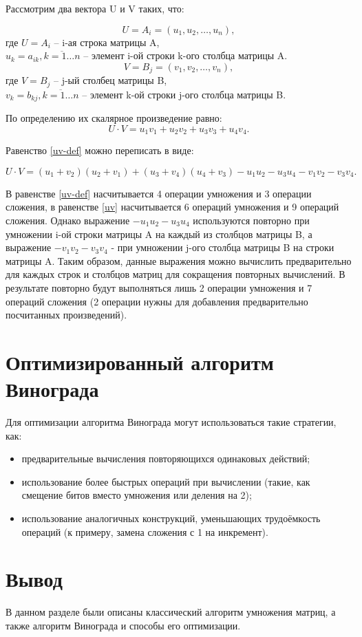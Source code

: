 Рассмотрим два вектора U и V таких, что:

\begin{equation}
	\label{u-def}
	U = A_{i} = (u_{1}, u_{2}, \ldots, u_{n}),
\end{equation}
где $U = A_{i}$ -- i-ая строка матрицы A,\\
$u_{k} = a_{ik}, \overline{k = 1 \ldots n}$ -- элемент i-ой строки k-ого столбца матрицы A.\\

\begin{equation}
	\label{v-def}
	V = B_{j} = (v_{1}, v_{2}, \ldots, v_{n}),
\end{equation}
где $V = B_{j}$ -- j-ый столбец матрицы B,\\
$v_{k} = b_{kj}, \overline{k = 1 \ldots n}$ -- элемент k-ой строки j-ого столбца матрицы B.

По определению их скалярное произведение равно:
\begin{equation}
	\label{uv-def}
	U \cdot V = u_{1}v_{1} + u_{2}v_{2} + u_{3}v_{3} + u_{4}v_{4}.
\end{equation}

Равенство \ref{uv-def} можно переписать в виде:

\begin{equation}
	\label{uv}
	U \cdot V = (u_{1} + v_{2})(u_{2} + v_{1}) + (u_{3} + v_{4})(u_{4} + v_{3}) - u_{1}u_{2} - u_{3}u_{4} - v_{1}v_{2} - v_{3}v_{4}.
\end{equation}

В равенстве \ref{uv-def} насчитывается 4 операции умножения и 3 операции сложения, в равенстве \ref{uv} насчитывается 6 операций умножения и 9 операций сложения. Однако выражение $- u_{1}u_{2} - u_{3}u_{4}$ используются повторно при умножении i-ой строки матрицы A на каждый из столбцов матрицы B, а выражение $- v_{1}v_{2} - v_{3}v_{4}$ - при умножении j-ого столбца матрицы B на строки матрицы A. Таким образом, данные выражения можно вычислить предварительно для каждых строк и столбцов матриц для сокращения повторных вычислений. В результате повторно будут выполняться лишь 2 операции умножения и 7 операций сложения (2 операции нужны для добавления предварительно посчитанных произведений).

\section{Оптимизированный алгоритм Винограда}
Для оптимизации алгоритма Винограда могут использоваться такие стратегии, как:
\begin{itemize}
	\item предварительные вычисления повторяющихся одинаковых действий;
	\item использование более быстрых операций при вычислении (такие, как смещение битов вместо умножения или деления на 2);
	\item использование аналогичных конструкций, уменьшающих трудоёмкость операций (к примеру, замена сложения с 1 на инкремент).
\end{itemize}

\section*{Вывод}

В данном разделе были описаны классический алгоритм умножения матриц, а также алгоритм Винограда и способы его оптимизации.

